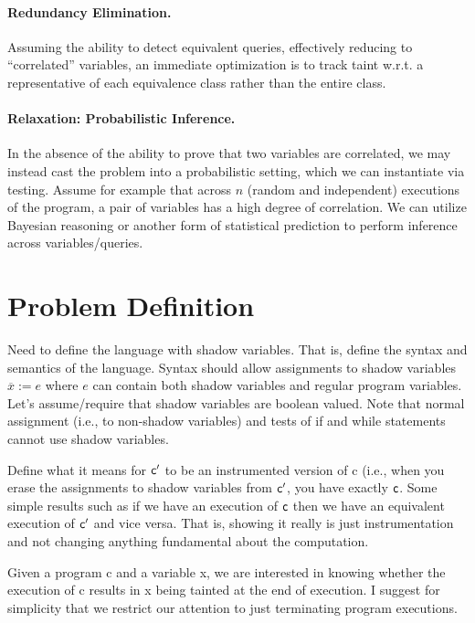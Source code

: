 \documentclass[]{article}
\begin{document}
\paragraph{Redundancy Elimination.} Assuming the ability to detect equivalent queries, effectively reducing to ``correlated'' variables, an immediate optimization is to track taint w.r.t. a representative of each equivalence class rather than the entire class.

\paragraph{Relaxation: Probabilistic Inference.} In the absence of the ability to prove that two variables are correlated, we may instead cast the problem into a probabilistic setting, which we can instantiate via testing. Assume for example that across $n$ (random and independent) executions of the program, a pair of variables has a high degree of correlation. We can utilize Bayesian reasoning or another form of statistical prediction to perform inference across variables/queries.

\section{Problem Definition}
Need to define the language with shadow variables. That is,
  define the syntax and semantics of the language. Syntax should allow
assignments to shadow variables $\overline{x} := e$ where $e$ can
contain both shadow variables and regular program variables. Let's
assume/require that shadow variables are boolean valued. Note that
normal assignment (i.e., to non-shadow variables) and tests of if and
while statements cannot use shadow variables.

Define what it means for ${\sf c}'$ to be an instrumented version of {\sf c} (i.e.,
when you erase the assignments to shadow variables from ${\sf c}'$,
you have exactly ${\sf c}$. Some simple results such as if we have an
execution of ${\sf c}$ then we have an equivalent execution of ${\sf
  c}'$ and vice versa. That is, showing it really is just
instrumentation and not changing anything fundamental about the computation.

Given a program {\sf c} and a variable {\sf x}, we are interested in
knowing whether the execution of {\sf c} results in {\sf x} being
tainted at the end of execution. I suggest for simplicity that
  we restrict our attention to just terminating program executions.
\end{document}
